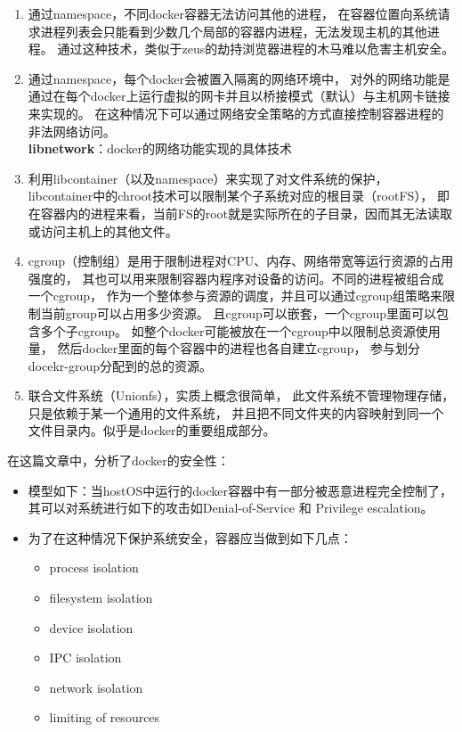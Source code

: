 \documentclass[AutoFakeBold,a4paper]{ctexart}
\begin{document}
\begin{enumerate}
    \item 通过namespace，不同docker容器无法访问其他的进程，
    在容器位置向系统请求进程列表会只能看到少数几个局部的容器内进程，无法发现主机的其他进程。
    通过这种技术，类似于zeus的劫持浏览器进程的木马难以危害主机安全。
    
    \item 通过namespace，每个docker会被置入隔离的网络环境中，
    对外的网络功能是通过在每个docker上运行虚拟的网卡并且以桥接模式（默认）与主机网卡链接来实现的。
    在这种情况下可以通过网络安全策略的方式直接控制容器进程的非法网络访问。\\
    \textbf{libnetwork}：docker的网络功能实现的具体技术
    
    \item 利用libcontainer（以及namespace）来实现了对文件系统的保护，
    libcontainer中的chroot技术可以限制某个子系统对应的根目录（rootFS），
    即在容器内的进程来看，当前FS的root就是实际所在的子目录，因而其无法读取或访问主机上的其他文件。
    
    \item cgroup（控制组）是用于限制进程对CPU、内存、网络带宽等运行资源的占用强度的，
    其也可以用来限制容器内程序对设备的访问。不同的进程被组合成一个cgroup，
    作为一个整体参与资源的调度，并且可以通过cgroup组策略来限制当前group可以占用多少资源。
    且cgroup可以嵌套，一个cgroup里面可以包含多个子cgroup。
    如整个docker可能被放在一个cgroup中以限制总资源使用量，
    然后docker里面的每个容器中的进程也各自建立cgroup，
    参与划分docekr-group分配到的总的资源。
    
    \item 联合文件系统（Unionfs），实质上概念很简单，
    此文件系统不管理物理存储，只是依赖于某一个通用的文件系统，
    并且把不同文件夹的内容映射到同一个文件目录内。似乎是docker的重要组成部分。
\end{enumerate}

在这篇文章中，分析了docker的安全性：\cite{bui2015analysis}

\begin{itemize}
    \item 模型如下：当hostOS中运行的docker容器中有一部分被恶意进程完全控制了，
    其可以对系统进行如下的攻击如Denial-of-Service 和 Privilege escalation。
    \item 为了在这种情况下保护系统安全，容器应当做到如下几点：
    \begin{itemize}
        \item process isolation
        \item filesystem isolation
        \item device isolation
        \item IPC isolation
        \item network isolation
        \item limiting of resources
    \end{itemize}
\end{itemize}
\end{document}
